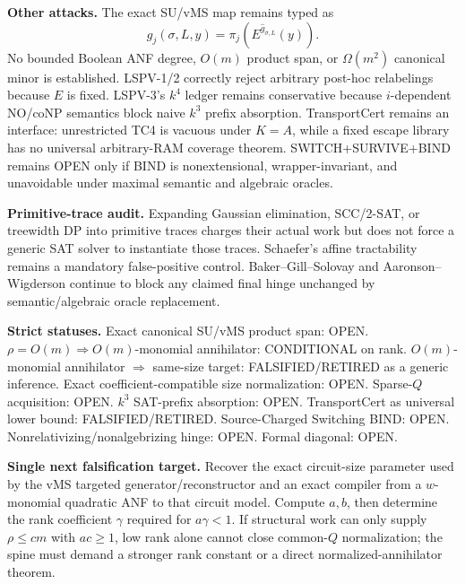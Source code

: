 \documentclass[11pt]{article}
\begin{document}
\textbf{Other attacks.}
The exact SU/vMS map remains typed as
\[
g_j(\sigma,L,y)=\pi_j(E^{\widehat g_{\sigma,L}}(y)).
\]
No bounded Boolean ANF degree, $O(m)$ product span, or $\Omega(m^2)$ canonical minor is established. LSPV-1/2 correctly reject arbitrary post-hoc relabelings because $E$ is fixed. LSPV-3's $k^4$ ledger remains conservative because $i$-dependent NO/coNP semantics block naive $k^3$ prefix absorption. TransportCert remains an interface: unrestricted TC4 is vacuous under $K=A$, while a fixed escape library has no universal arbitrary-RAM coverage theorem. SWITCH+SURVIVE+BIND remains OPEN only if BIND is nonextensional, wrapper-invariant, and unavoidable under maximal semantic and algebraic oracles.

\textbf{Primitive-trace audit.}
Expanding Gaussian elimination, SCC/2-SAT, or treewidth DP into primitive traces charges their actual work but does not force a generic SAT solver to instantiate those traces. Schaefer's affine tractability remains a mandatory false-positive control. Baker--Gill--Solovay and Aaronson--Wigderson continue to block any claimed final hinge unchanged by semantic/algebraic oracle replacement.

\textbf{Strict statuses.}
Exact canonical SU/vMS product span: OPEN.
$\rho=O(m)\Rightarrow O(m)$-monomial annihilator: CONDITIONAL on rank.
$O(m)$-monomial annihilator $\Rightarrow$ same-size target: FALSIFIED/RETIRED as a generic inference.
Exact coefficient-compatible size normalization: OPEN.
Sparse-$Q$ acquisition: OPEN.
$k^3$ SAT-prefix absorption: OPEN.
TransportCert as universal lower bound: FALSIFIED/RETIRED.
Source-Charged Switching BIND: OPEN.
Nonrelativizing/nonalgebrizing hinge: OPEN.
Formal diagonal: OPEN.

\textbf{Single next falsification target.}
Recover the exact circuit-size parameter used by the vMS targeted generator/reconstructor and an exact compiler from a $w$-monomial quadratic ANF to that circuit model. Compute $a,b$, then determine the rank coefficient $\gamma$ required for $a\gamma<1$. If structural work can only supply $\rho\le cm$ with $ac\ge1$, low rank alone cannot close common-$Q$ normalization; the spine must demand a stronger rank constant or a direct normalized-annihilator theorem.

\end{document}
